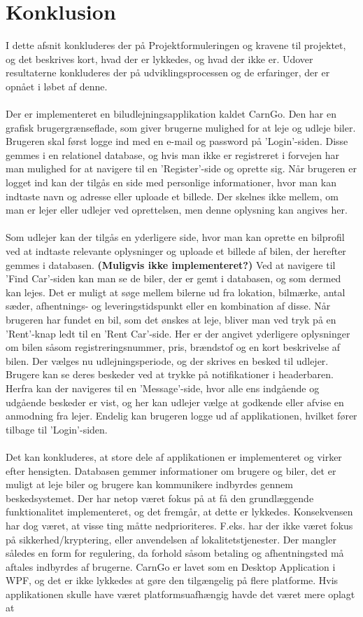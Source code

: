 \documentclass[Rapport/Rapport_main.tex]{subfiles}
\begin{document}
\section{Konklusion}
I dette afsnit konkluderes der på Projektformuleringen og kravene til projektet, og det beskrives kort, hvad der er lykkedes, og hvad der ikke er. Udover resultaterne konkluderes der på udviklingsprocessen og de erfaringer, der er opnået i løbet af denne.\\\\Der er implementeret en biludlejningsapplikation kaldet CarnGo. Den har en grafisk brugergrænseflade, som giver brugerne mulighed for at leje og udleje biler. Brugeren skal først logge ind med en e-mail og password på 'Login'-siden. Disse gemmes i en relationel database, og hvis man ikke er registreret i forvejen har man mulighed for at navigere til en 'Register'-side og oprette sig. Når brugeren er logget ind kan der tilgås en side med personlige informationer, hvor man kan indtaste navn og adresse eller uploade et billede. Der skelnes ikke mellem, om man er lejer eller udlejer ved oprettelsen, men denne oplysning kan angives her.\\\\Som udlejer kan der tilgås en yderligere side, hvor man kan oprette en bilprofil ved at indtaste relevante oplysninger og uploade et billede af bilen, der herefter gemmes i databasen. \textbf{(Muligvis ikke implementeret?)} Ved at navigere til 'Find Car'-siden kan man se de biler, der er gemt i databasen, og som dermed kan lejes. Det er muligt at søge mellem bilerne ud fra lokation, bilmærke, antal sæder, afhentnings- og leveringstidspunkt eller en kombination af disse. Når brugeren har fundet en bil, som det ønskes at leje, bliver man ved tryk på en 'Rent'-knap ledt til en 'Rent Car'-side. Her er der angivet yderligere oplysninger om bilen såsom registreringsnummer, pris, brændstof og en kort beskrivelse af bilen. Der vælges nu udlejningsperiode, og der skrives en besked til udlejer. Brugere kan se deres beskeder ved at trykke på notifikationer i headerbaren. Herfra kan der navigeres til en 'Message'-side, hvor alle ens indgående og udgående beskeder er vist, og her kan udlejer vælge at godkende eller afvise en anmodning fra lejer. Endelig kan brugeren logge ud af applikationen, hvilket fører tilbage til 'Login'-siden. \\\\Det kan konkluderes, at store dele af applikationen er implementeret og virker efter hensigten. Databasen gemmer informationer om brugere og biler, det er muligt at leje biler og brugere kan kommunikere indbyrdes gennem beskedsystemet. Der har netop været fokus på at få den grundlæggende funktionalitet implementeret, og det fremgår, at dette er lykkedes. Konsekvensen har dog været, at visse ting måtte nedprioriteres. F.eks. har der ikke været fokus på sikkerhed/kryptering, eller anvendelsen af lokalitetstjenester. Der mangler således en form for regulering, da forhold såsom betaling og afhentningsted må aftales indbyrdes af brugerne. CarnGo er lavet som en Desktop Application i WPF, og det er ikke lykkedes at gøre den tilgængelig på flere platforme. Hvis applikationen skulle have været platformsuafhængig havde det været mere oplagt at 
\end{document}
